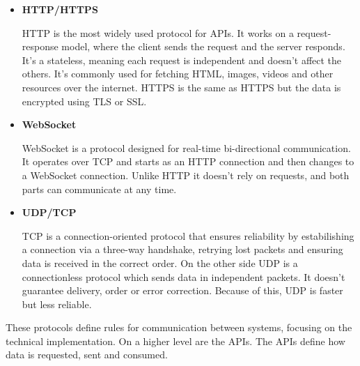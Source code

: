\begin{itemize}

	\item \textbf{\gls{HTTP}/\gls{HTTP}S}

	      \gls{HTTP} is the most widely used protocol for \gls{API}s. It works on a
	      request-response model, where the client sends the request and the server
	      responds. It's a stateless, meaning each request is independent and doesn't
	      affect the others. It's commonly used for fetching \gls{HTML}, images, videos
	      and other resources over the internet. \gls{HTTPS} is the same as \gls{HTTPS} but the
	      data is encrypted using \gls{TLS} or \gls{SSL}.


	\item \textbf{WebSocket}

	      WebSocket is a protocol designed for real-time bi-directional communication.
	      It operates over \gls{TCP} and starts as an \gls{HTTP} connection and then changes to a
	      WebSocket connection. Unlike \gls{HTTP} it doesn't rely on requests, and both
	      parts can communicate at any time.


	\item \textbf{\gls{UDP}/\gls{TCP}}

	      \gls{TCP} is a connection-oriented protocol that ensures reliability by
	      estabilishing a connection via a three-way handshake, retrying lost
	      packets and ensuring data is received in the correct order.
	      On the other side \gls{UDP} is a connectionless protocol which sends data in
	      independent packets. It doesn't guarantee delivery, order or error
	      correction. Because of this, \gls{UDP} is faster but less reliable.


\end{itemize}


These protocols define rules for communication between systems, focusing on the
technical implementation. On a higher level are the \gls{API}s.
The \gls{API}s define how data is requested, sent and consumed.


